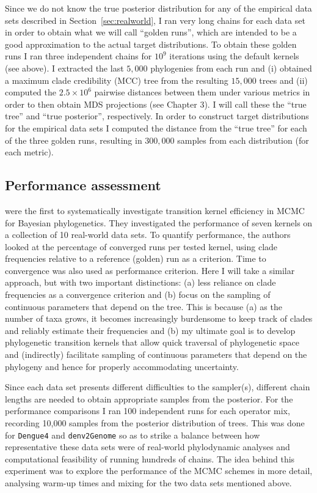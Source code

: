 Since we do not know the true posterior distribution for any of the empirical data sets described in Section~\ref{sec:realworld}, I ran very long chains for each data set in order to obtain what we will call ``golden runs'', which are intended to be a good approximation to the actual target distributions.
To obtain these golden runs I ran three independent chains for $10^9$ iterations using the default kernels (see above).
I extracted the last $5, 000$ phylogenies from each run and (i) obtained a maximum clade credibility (MCC) tree from the resulting $15, 000$ trees and (ii) computed the $2.5 \times 10^6$ pairwise distances between them under various metrics in order to then obtain MDS projections (see Chapter 3).
I will call these the ``true tree'' and ``true posterior'', respectively.
In order to construct target distributions for the empirical data sets I computed the distance from the ``true tree'' for each of the three golden runs, resulting in $300, 000$  samples from each distribution (for each metric).

\subsection{Performance assessment}
\label{sec:performance_methods}

\cite{Lakner2008} were the first to systematically investigate transition kernel efficiency in MCMC for Bayesian phylogenetics.
They investigated the performance of seven kernels on a collection of 10 real-world data sets.
To quantify performance, the authors looked at the percentage of converged runs per tested kernel, using clade frequencies relative to a reference (golden) run as a criterion.
Time to convergence was also used as performance criterion.
Here I will take a similar approach, but with two important distinctions: (a) less reliance on clade frequencies as a convergence criterion and (b) focus on the sampling of continuous parameters that depend on the tree.
This is because (a) as the number of taxa grows, it becomes increasingly burdensome to keep track of clades and reliably estimate their frequencies and (b) my ultimate goal is to develop phylogenetic transition kernels that allow quick traversal of phylogenetic space and (indirectly) facilitate sampling of continuous parameters that depend on the phylogeny and hence for properly accommodating uncertainty.

Since each data set presents different difficulties to the sampler(s), different chain lengths are needed to obtain appropriate samples from the posterior.
For the performance comparisons I ran 100 independent runs for each operator mix, recording 10,000 samples from the posterior distribution of trees.
This was done for \verb|Dengue4| and \verb|denv2Genome| so as to strike a balance between how representative these data sets were of real-world phylodynamic analyses and computational feasibility of running hundreds of chains.
The idea behind this experiment was to explore the performance of the MCMC schemes in more detail, analysing warm-up times and mixing for the two data sets mentioned above.

